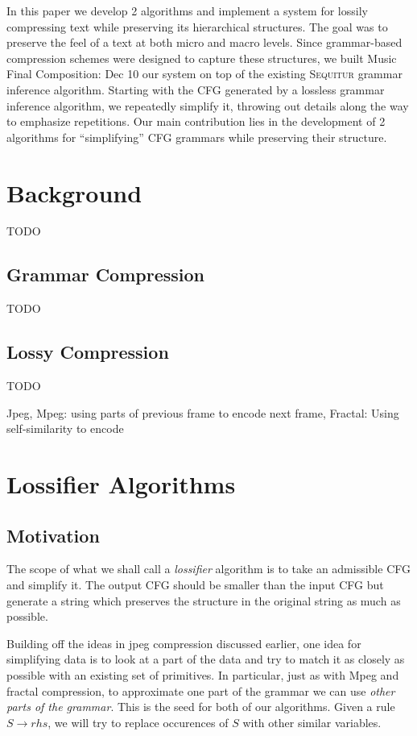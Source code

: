 \documentclass[11pt]{article}
\newcommand{\Sequitur}{\textsc{Sequitur}\xspace}
\begin{document}
In this paper we develop 2 algorithms and implement a system for lossily
compressing text while preserving its hierarchical structures. The goal
was to preserve the feel of a text at both micro and macro levels. 
Since grammar-based compression schemes were designed to capture
these structures, we built
Music Final Composition: Dec 10
our system on top of the existing \Sequitur grammar inference algorithm. 
Starting with the CFG generated by a lossless grammar
inference algorithm, we repeatedly simplify it, throwing out details
along the way to emphasize repetitions. Our main contribution lies in the
development of 2 algorithms for ``simplifying'' CFG grammars while 
preserving their structure.

\section{Background}

TODO

\subsection{Grammar Compression}

TODO

\subsection{Lossy Compression}

TODO

Jpeg, Mpeg: using parts of previous frame to encode next frame, 
Fractal: Using self-similarity to encode

\section{Lossifier Algorithms}

\subsection{Motivation}

The scope of what we shall call a \emph{lossifier} algorithm is to take
an admissible CFG and simplify it. The output CFG should be smaller
than the input CFG but generate a string which preserves the
structure in the original string as much as possible. 

Building off the ideas in jpeg compression discussed
earlier, one idea for simplifying data is to look at a part
of the data and try to match it as closely as possible with an
existing set of primitives. In particular, just as with Mpeg and
fractal compression, to approximate one part of the grammar
we can use \emph{other parts of the grammar}. This is the seed for
both of our algorithms. Given a rule $S \rightarrow rhs$, we will
try to replace occurences of $S$ with other similar variables.
\end{document}
